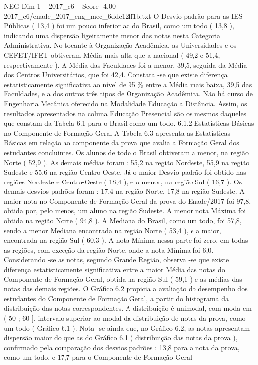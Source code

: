 \begin{textsample}{NEG Dim 1 – 2017\_c6 – Score -4.00 – 2017\_c6/enade\_2017\_eng\_mec\_6ddc12ff1b.txt}
O Desvio padrão para as IES Públicas ( 13,4 ) foi um pouco inferior ao do Brasil, como um todo ( 13,8 ), indicando uma dispersão ligeiramente menor das notas nesta Categoria Administrativa.
No tocante à Organização Acadêmica, as Universidades e os CEFET/IFET obtiveram Média mais alta que a nacional ( 49,2 e 51,4, respectivamente ).
A Média das Faculdades foi a menor, 39,5, seguida da Média dos Centros Universitários, que foi 42,4.
Constata -se que existe diferença estatisticamente significativa ao nível de 95 \% entre a Média mais baixa, 39,5 das Faculdades, e a dos outros três tipos de Organização Acadêmica.
Não há curso de Engenharia Mecânica oferecido na Modalidade Educação a Distância.
Assim, os resultados apresentados na coluna Educação Presencial são os mesmos daqueles que constam da Tabela 6.1 para o Brasil como um todo. 6.1.2 Estatísticas Básicas no Componente de Formação Geral A Tabela 6.3 apresenta as Estatísticas Básicas em relação ao componente da prova que avalia a Formação Geral dos estudantes concluintes.
Os alunos de todo o Brasil obtiveram a menor, na região Norte ( 52,9 ).
As demais médias foram : 55,2 na região Nordeste, 55,9 na região Sudeste e 55,6 na região Centro-Oeste.
Já o maior Desvio padrão foi obtido nas regiões Nordeste e Centro-Oeste ( 18,4 ), e o menor, na região Sul ( 16,7 ).
Os demais desvios padrões foram : 17,4 na região Norte, 17,8 na região Sudeste.
A maior nota no Componente de Formação Geral da prova do Enade/2017 foi 97,8, obtida por, pelo menos, um aluno na região Sudeste.
A menor nota Máxima foi obtida na região Norte ( 94,8 ).
A Mediana do Brasil, como um todo, foi 57,8, sendo a menor Mediana encontrada na região Norte ( 53,4 ), e a maior, encontrada na região Sul ( 60,3 ).
A nota Mínima nessa parte foi zero, em todas as regiões, com exceção da região Norte, onde a nota Mínima foi 6,0.
Considerando -se as notas, segundo Grande Região, observa -se que existe diferença estatisticamente significativa entre a maior Média das notas do Componente de Formação Geral, obtida na região Sul ( 59,1 ) e as médias das notas das demais regiões.
O Gráfico 6.2 propicia a avaliação do desempenho dos estudantes do Componente de Formação Geral, a partir do histograma da distribuição das notas correspondentes.
A distribuição é unimodal, com moda em ( 50 ; 60 ], intervalo superior ao modal da distribuição de notas da prova, como um todo ( Gráfico 6.1 ).
Nota -se ainda que, no Gráfico 6.2, as notas apresentam dispersão maior do que as do Gráfico 6.1 ( distribuição das notas da prova ), confirmado pela comparação dos desvios padrões : 13,8 para a nota da prova, como um todo, e 17,7 para o Componente de Formação Geral.

\end{textsample}
